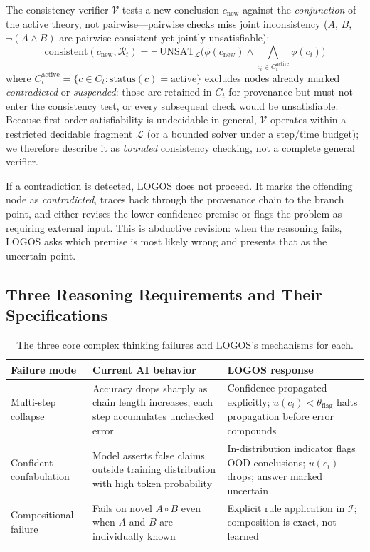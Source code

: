 \documentclass[12pt]{article}
\begin{document}
The consistency verifier $\mathcal{V}$ tests a new conclusion $c_{\text{new}}$ against the \emph{conjunction} of the active theory, not pairwise---pairwise checks miss joint inconsistency ($A$, $B$, $\neg(A\wedge B)$ are pairwise consistent yet jointly unsatisfiable):
\begin{equation}
\text{consistent}(c_{\text{new}}, \mathcal{R}_t) = \neg\,\mathrm{UNSAT}_{\mathcal{L}}\!\Big( \phi(c_{\text{new}}) \wedge \bigwedge_{c_i \in C_t^{\text{active}}} \phi(c_i) \Big)
\end{equation}
where $C_t^{\text{active}} = \{c \in C_t : \mathrm{status}(c) = \text{active}\}$ excludes nodes already marked \emph{contradicted} or \emph{suspended}: those are retained in $C_t$ for provenance but must not enter the consistency test, or every subsequent check would be unsatisfiable. Because first-order satisfiability is undecidable in general, $\mathcal{V}$ operates within a restricted decidable fragment $\mathcal{L}$ (or a bounded solver under a step/time budget); we therefore describe it as \emph{bounded} consistency checking, not a complete general verifier.

If a contradiction is detected, LOGOS does not proceed. It marks the offending node as \textit{contradicted}, traces back through the provenance chain to the branch point, and either revises the lower-confidence premise or flags the problem as requiring external input. This is abductive revision: when the reasoning fails, LOGOS asks which premise is most likely wrong and presents that as the uncertain point.

\subsection{Three Reasoning Requirements and Their Specifications}

\begin{table}[H]
\centering\small
\begin{tabular}{p{3.5cm}p{3.5cm}p{5cm}}
\toprule
\textbf{Failure mode} & \textbf{Current AI behavior} & \textbf{LOGOS response} \\
\midrule
Multi-step collapse & Accuracy drops sharply as chain length increases; each step accumulates unchecked error & Confidence propagated explicitly; $u(c_i) < \theta_{\text{flag}}$ halts propagation before error compounds \\
Confident confabulation & Model asserts false claims outside training distribution with high token probability & In-distribution indicator flags OOD conclusions; $u(c_i)$ drops; answer marked uncertain \\
Compositional failure & Fails on novel $A \circ B$ even when $A$ and $B$ are individually known & Explicit rule application in $\mathcal{I}$; composition is exact, not learned \\
\bottomrule
\end{tabular}
\caption{The three core complex thinking failures and LOGOS's mechanisms for each.}
\label{tab:logos_failures}
\end{table}
\end{document}
